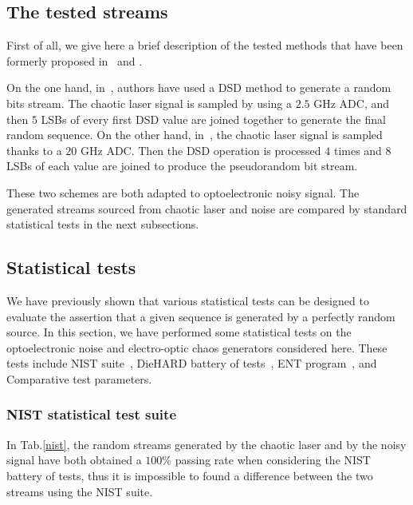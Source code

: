 \subsection{The tested streams}
%

First of all, we give here a brief description of the tested methods
that have been formerly proposed in~\cite{ultrafast2009} and
\cite{ultrafast2010}.

On the one hand, in~\cite{ultrafast2009}, authors have used a DSD
method to generate a random bits stream. The chaotic laser signal is
sampled by using a $2.5$ GHz ADC, and then $5$ LSBs of every first DSD
value are joined together to generate the final random sequence.  On
the other hand, in~\cite{ultrafast2010}, the chaotic laser signal is
sampled thanks to a $20$ GHz ADC. Then the DSD operation is processed
$4$ times and $8$ LSBs of each value are joined to produce the
pseudorandom bit stream.

These two schemes are both adapted to optoelectronic noisy signal. The
generated streams sourced from chaotic laser and noise are compared by
standard statistical tests in the next subsections.

\subsection{Statistical tests}
%
We have previously shown that various
statistical tests can be designed to evaluate the assertion that a given
sequence is generated by a perfectly random source. In this section, we have performed
some statistical tests on the optoelectronic noise and electro-optic
chaos generators considered here. These tests include NIST
suite~\cite{Barker05recommendationfor}, DieHARD battery of tests~\cite{Marsaglia1996}, ENT
program~\cite{ent}, and Comparative test parameters. 

\subsubsection{NIST statistical test suite}

In Tab.\ref{nist}, the random streams generated by the chaotic laser
and by the noisy signal have both obtained a $100\%$ passing rate when
considering the NIST battery of tests, thus it is impossible to found
a difference between the two streams using the NIST suite.


